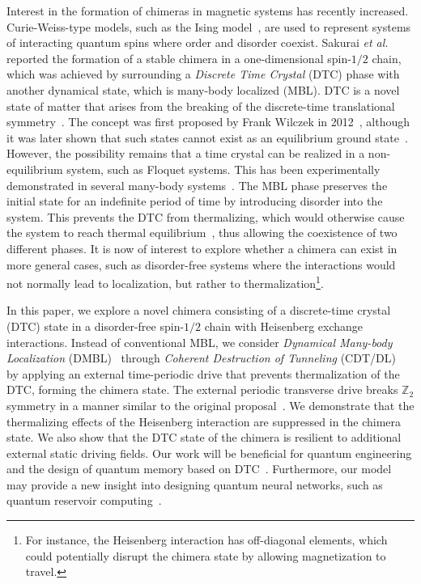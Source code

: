 \documentclass[12pt]{iopart}
\begin{document}
Interest in the formation of chimeras in magnetic systems has recently increased. Curie-Weiss-type models, such as the Ising model~\cite{singh_chimera_2011}, are used to represent systems of interacting quantum spins where order and disorder coexist. Sakurai \textit{et al.}~\cite{sakurai_phys_nodate} reported the formation of a stable chimera in a one-dimensional spin-$1/2$ chain, which was achieved by surrounding a \textit{Discrete Time Crystal} (DTC) phase with another dynamical state, which is many-body localized (MBL). DTC is a novel state of matter that arises from the breaking of the discrete-time translational symmetry~\cite{else_floquet_2016}. The concept was first proposed by Frank Wilczek in 2012~\cite{wilczek_quantum_2012}, although it was later shown that such states cannot exist as an equilibrium ground state~\cite{Bruno_comment_1, Bruno2013, watanabe_absence_2015}. However, the possibility remains that a time crystal can be realized in a non-equilibrium system, such as Floquet systems. This has been experimentally demonstrated in several many-body systems~\cite{huang2018,taheri_all-optical_2022, Soham2018, zhang_observation_2017, yao_time_2018,frey_realization_2022, rovny_observation_2018, sacha_time_nodate,golletz_basis_2022}. The MBL phase preserves the initial state for an indefinite period of time by introducing disorder into the system. This prevents the DTC from thermalizing, which would otherwise cause the system to reach thermal equilibrium~\cite{zhang_observation_2017,alet_many-body_2018,else_floquet_2016,smith_many-body_2016,nguyen_signature_2021}, thus allowing the coexistence of two different phases. It is now of interest to explore whether a chimera can exist in more general cases, such as disorder-free systems where the interactions would not normally lead to localization, but rather to thermalization\footnote{For instance, the Heisenberg interaction has off-diagonal elements, which could potentially disrupt the chimera state by allowing magnetization to travel.}.

In this paper, we explore a novel chimera consisting of a discrete-time crystal (DTC) state in a disorder-free spin-$1/2$ chain with Heisenberg exchange interactions. Instead of conventional MBL, we consider \textit{Dynamical Many-body Localization} (DMBL)~\cite{Keser2016, haldar_dynamical_2017,haldar_dynamical_2021,bhattacharyya_transverse_2012,aditya2023dynamical,dutta2014,das_exotic_2010} through \textit{Coherent Destruction of Tunneling} (CDT/DL)~\cite{Grossmann1991,Kayanuma2008} by applying an external time-periodic drive that prevents thermalization of the DTC, forming the chimera state. The external periodic transverse drive breaks $\mathbb{Z}_2$ symmetry in a manner similar to the original proposal~\cite{sakurai_phys_nodate}. We demonstrate that the thermalizing effects of the Heisenberg interaction are suppressed in the chimera state. We also show that the DTC state of the chimera is resilient to additional external static driving fields. Our work will be beneficial for quantum engineering and the design of quantum memory based on DTC~\cite{zhang_observation_2017}. Furthermore, our model may provide a new insight into designing quantum neural networks, such as quantum reservoir computing~\cite{Fujii_2017, Martinez_2021,Mujal_2021, Akitada2022}.
\end{document}
